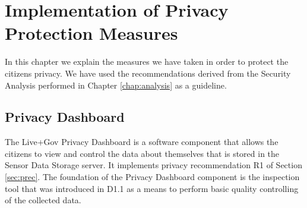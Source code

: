 \chapter{Implementation of Privacy Protection Measures}
\label{chap:impl}

In this chapter we explain the measures we have taken in order to
protect the citizens privacy. We have used the recommendations derived
from the Security Analysis performed in Chapter \ref{chap:analysis} as
a guideline.

\section{Privacy Dashboard}
The Live+Gov Privacy Dashboard is a software component that allows the
citizens to view and control the data about themselves that is stored
in the Sensor Data Storage server. It implements privacy
recommendation R1 of Section \ref{sec:prec}.  The foundation of the
Privacy Dashboard component is the inspection tool that was introduced
in D1.1 as a means to perform basic quality controlling of the
collected data.

